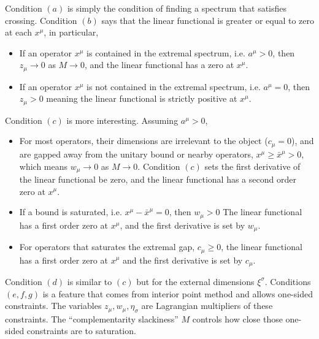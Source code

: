 \documentclass[11pt]{article}
\renewcommand{\(}{\left(}
\renewcommand{\)}{\right)}
\renewcommand{\[}{\left[}
\renewcommand{\]}{\right]}
\newcommand{\<}{\left\langle}
\renewcommand{\>}{\right\rangle}
\begin{document}
Condition $(a)$ is simply the condition of finding a spectrum that satisfies crossing. Condition $(b)$ says that the linear functional is greater or equal to zero at each $x^\mu$, in particular,
\begin{itemize}
\item If an operator $x^\mu$ is contained in the extremal spectrum, i.e. $a^\mu > 0$, then $z_\mu \rightarrow 0$ as $M \rightarrow 0$, and the linear functional has a zero at $x^\mu$.
\item If an operator $x^\mu$ is not contained in the extremal spectrum, i.e. $a^\mu = 0$, then $z_\mu > 0$ meaning the linear functional is strictly positive at $x^\mu$.
\end{itemize}
Condition $(c)$ is more interesting. Assuming $a^\mu > 0$, 
\begin{itemize}
\item For most operators, their dimensions are irrelevant to the object ($c_\mu = 0$), and are gapped away from the unitary bound or nearby operators, $x^\mu \geq \bar x^\mu > 0$, which means $w_\mu \rightarrow 0$ as $M\rightarrow 0$. Condition $(c)$ sets the first derivative of the linear functional be zero, and the linear functional has a second order zero at $x^\mu$. 
\item If a bound is saturated, i.e. $x^\mu - \bar x^\mu = 0$, then $w_\mu > 0$ The linear functional has a first order zero at $x^\mu$, and the first derivative is set by $w_\mu$.
\item For operators that saturates the extremal gap, $c_\mu \geq 0$, the linear functional has a first order zero at $x^\mu$ and the first derivative is set by $c_\mu$.
\end{itemize}
Condition $(d)$ is similar to $(c)$ but for the external dimensions $\xi^\sigma$.
Conditions $(e,f,g)$ is a feature that comes from interior point method and allows one-sided constraints. The variables $z_\mu, w_\mu, \eta_\sigma$ are Lagrangian multipliers of these constraints. The ``complementarity slackiness'' $M$ controls how close those one-sided constraints are to saturation. 
\end{document}
